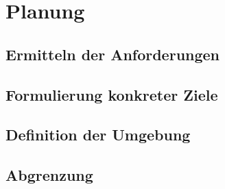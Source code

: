 
\chapter{Planung}\label{cha:Planung}

\section{Ermitteln der Anforderungen}

\section{Formulierung konkreter Ziele}

\section{Definition der Umgebung}

\section{Abgrenzung}